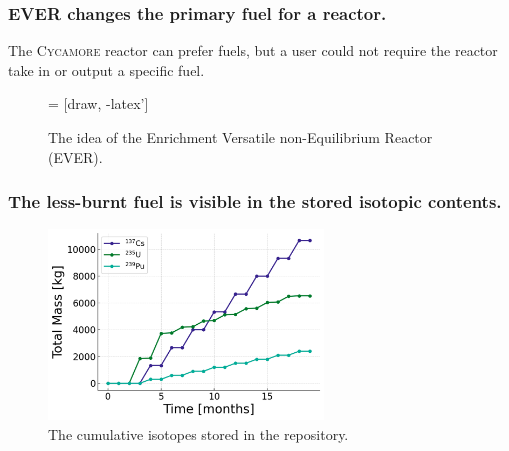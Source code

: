 \documentclass[9pt]{beamer}
\newcommand{\cycamore}{\textsc{Cycamore}\xspace}
\begin{document}
\begin{frame}
  \frametitle{EVER changes the primary fuel for a reactor.}
  The \cycamore reactor can prefer fuels, but a user could not require the reactor take in or output a specific fuel.
  \begin{figure}
  \centering
     = [draw, -latex']
  \caption{The idea of the Enrichment Versatile non-Equilibrium Reactor (EVER).}
  \end{figure}
\end{frame}


\begin{frame}
  \frametitle{The less-burnt fuel is visible in the stored isotopic contents.}
  \begin{figure}
    \centering
    \includegraphics[width=0.65\textwidth]{images/mass_isotopes.png}
    \caption{The cumulative isotopes stored in the repository.}
  \end{figure}
\end{frame}
\end{document}
